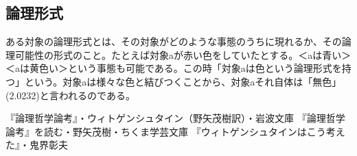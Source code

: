 \documentclass[a4paper,11pt]{jsarticle}
\begin{document}
\subsection{論理形式}
ある対象の論理形式とは、その対象がどのような事態のうちに現れるか、その論理可能性の形式のこと。たとえば対象aが赤い色をしていたとする。＜aは青い＞＜aは黄色い＞という事態も可能である。この時「対象aは色という論理形式を持つ」という。対象aは様々な色と結びつくことから、対象aそれ自体は「無色」(2.0232)と言われるのである。

\begin{thebibliography}{9}
	 『論理哲学論考』・ウィトゲンシュタイン（野矢茂樹訳）・岩波文庫
	 『論理哲学論考』を読む・野矢茂樹・ちくま学芸文庫
	 『ウィトゲンシュタインはこう考えた』・鬼界彰夫
\end{thebibliography}
\end{document}
